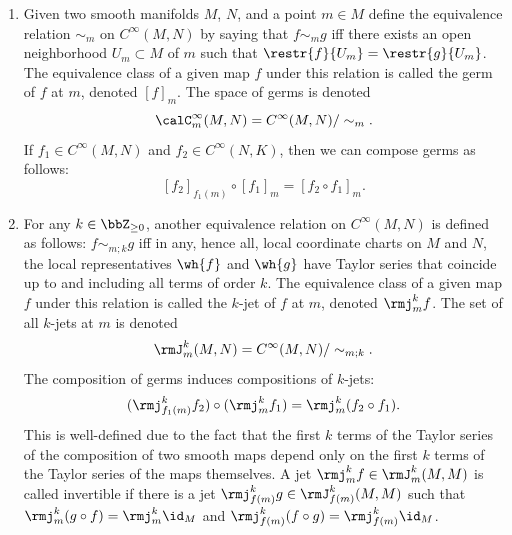 \begin{defn}\label{def jet bundles}
    \begin{enumerate}
        \item Given two smooth manifolds $M$, $N$, and a point $m\in M$ define the equivalence relation $\sim_m$ on $C^\infty(M,N)$ by saying that $f\sim_m g$ iff there exists an open neighborhood $U_m\subset M$ of $m$ such that $\restr{f}{U_m}=\restr{g}{U_m}$. The equivalence class of a given map $f$ under this relation is called the germ of $f$ at $m$, denoted $[f]_m$. The space of germs is denoted
        \[\calC^\infty_m(M,N)=C^\infty(M,N)\slash \sim_m.\]
        If $f_1\in C^\infty(M,N)$ and $f_2\in C^\infty(N,K)$, then we can compose germs as follows:
        \[[f_2]_{f_1(m)}\circ [f_1]_{m}=[f_2\circ f_1]_m.\]
        \item For any $k\in\bbZ_{\geq 0}$, another equivalence relation on $C^\infty(M,N)$ is defined as follows: $f\sim_{m;k}g$ iff in any, hence all, local coordinate charts on $M$ and $N$, the local representatives $\wh{f}$ and $\wh{g}$ have Taylor series that coincide up to and including all terms of order $k$. The equivalence class of a given map $f$ under this relation is called the $k$-jet of $f$ at $m$, denoted $\rmj_m^k f$. The set of all $k$-jets at $m$ is denoted
        \[\rmJ_m^k(M,N)=C^\infty (M,N)\slash \sim_{m;k}.\]
        The composition of germs induces compositions of $k$-jets:
        \[(\rmj_{f_1(m)}^kf_2)\circ (\rmj_m^k f_1)=\rmj_m^k(f_2\circ f_1).\]
        This is well-defined due to the fact that the first $k$ terms of the Taylor series of the composition of two smooth maps depend only on the first $k$ terms of the Taylor series of the maps themselves.
        A jet $\rmj_m^kf\in \rmJ^k_m(M,M)$ is called invertible if there is a jet $\rmj^k_{f(m)}g\in \rmJ^k_{f(m)}(M,M)$ such that $\rmj^k_m(g\circ f)=\rmj^k_m\id_M$ and $\rmj^k_{f(m)}(f\circ g)=\rmj^k_{f(m)}\id_M$. 
        

\end{enumerate}
\end{defn}
